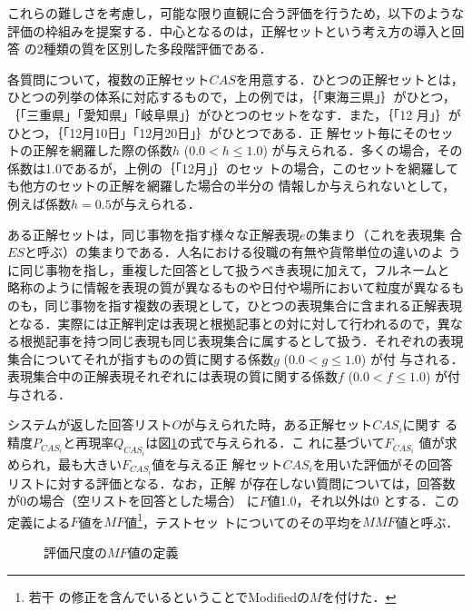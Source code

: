 \documentclass[japanese]{jnlp_1.4}
\begin{document}
これらの難しさを考慮し，可能な限り直観に合う評価を行うため，以下のような
評価の枠組みを提案する．中心となるのは，正解セットという考え方の導入と回答
の2種類の質を区別した多段階評価である．

各質問について，複数の正解セット$\mathit{CAS}$を用意する．ひとつの正解セットとは，
ひとつの列挙の体系に対応するもので，上の例では，｛「東海三県」｝がひとつ，
｛「三重県」「愛知県」「岐阜県」｝がひとつのセットをなす．また，｛「12
月」｝がひとつ，｛「12月10日」「12月20日」｝がひとつである．正
解セット毎にそのセットの正解を網羅した際の係数$h$ ($0.0 < h \leq 1.0$) が与えられる．多くの場合，その係数は1.0であるが，上例の｛「12月」｝のセッ
トの場合，このセットを網羅しても他方のセットの正解を網羅した場合の半分の
情報しか与えられないとして，例えば係数$h=0.5$が与えられる．

ある正解セットは，同じ事物を指す様々な正解表現$e$の集まり（これを表現集
合$\mathit{ES}$と呼ぶ）の集まりである．人名における役職の有無や貨幣単位の違いのよ
うに同じ事物を指し，重複した回答として扱うべき表現に加えて，フルネームと
略称のように情報を表現の質が異なるものや日付や場所において粒度が異なるも
のも，同じ事物を指す複数の表現として，ひとつの表現集合に含まれる正解表現
となる．実際には正解判定は表現と根拠記事との対に対して行われるので，異な
る根拠記事を持つ同じ表現も同じ表現集合に属するとして扱う．それぞれの表現
集合についてそれが指すものの質に関する係数$g$ ($0.0 < g \leq 1.0$) が付
与される．表現集合中の正解表現それぞれには表現の質に関する係数$f$ ($0.0
< f \leq 1.0$) が付与される．

システムが返した回答リスト$O$が与えられた時，ある正解セット$\mathit{CAS}_i$に関す
る精度$P_{\mathit{CAS}_i}$と再現率$Q_{\mathit{CAS}_i}$は図\ref{mmfdef}の式で与えられる．こ
れに基づいて$F_{\mathit{CAS}_i}$ 値が求められ，最も大きい$F_{\mathit{CAS}_i}$値を与える正
解セット$\mathit{CAS}_i$を用いた評価がその回答リストに対する評価となる．なお，正解
が存在しない質問については，回答数が0の場合（空リストを回答とした場合）
に$F$値1.0，それ以外は0 とする．この定義による$F$値を$\mathit{MF}$値\footnote{
	若干
	の修正を含んでいるということでModifiedの$M$を付けた．
	}，テストセッ
トについてのその平均を$\mathit{MMF}$値と呼ぶ．


\begin{figure}[t]

\caption{評価尺度の$\mathit{MF}$値の定義}
\label{mmfdef}
\end{figure}
\end{document}
